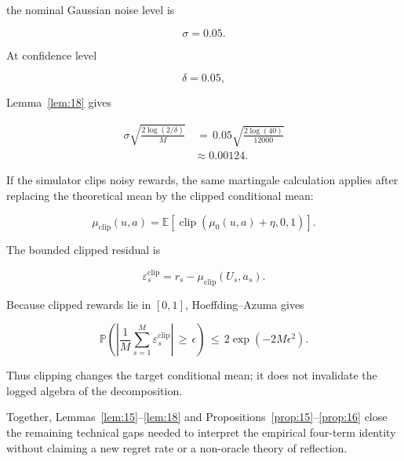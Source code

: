 \documentclass{article} %
\begin{document}
the nominal Gaussian noise level is

\begin{equation}
\label{eq:app-six-noise-example-sigma}
\sigma=0.05.
\end{equation}

At confidence level

\begin{equation}
\label{eq:app-six-noise-example-delta}
\delta=0.05,
\end{equation}

Lemma~\ref{lem:18} gives

\begin{align}
\label{eq:app-six-noise-example-radius}
\sigma\sqrt{\frac{2\log(2/\delta)}{M}}
&\,=\,
0.05\sqrt{\frac{2\log(40)}{12000}}
\\
&\approx
0.00124.
\end{align}

If the simulator clips noisy rewards, the same martingale calculation applies after replacing the theoretical mean by the clipped conditional mean:

\begin{equation}
\label{eq:app-six-clipped-mean}
\mu_{\mathrm{clip}}(u,a)
=
\mathbb{E}\!\left[
\operatorname{clip}\!\left(\mu_0(u,a)+\eta,0,1\right)
\right].
\end{equation}

The bounded clipped residual is

\begin{equation}
\label{eq:app-six-clipped-residual}
\varepsilon^{\mathrm{clip}}_s
=
r_s-\mu_{\mathrm{clip}}(U_s,a_s).
\end{equation}

Because clipped rewards lie in \([0,1]\), Hoeffding--Azuma gives

\begin{equation}
\label{eq:app-six-clipped-tail}
\mathbb{P}\!\left(
\left|
\frac{1}{M}\sum_{s=1}^{M}\varepsilon^{\mathrm{clip}}_s
\right|
\,\ge\,
\epsilon
\right)
\,\le\,
2\exp(-2M\epsilon^2).
\end{equation}

Thus clipping changes the target conditional mean; it does not invalidate the logged algebra of the decomposition.

Together, Lemmas~\ref{lem:15}--\ref{lem:18} and Propositions~\ref{prop:15}--\ref{prop:16} close the remaining technical gaps needed to interpret the empirical four-term identity without claiming a new regret rate or a non-oracle theory of reflection.
\end{document}
